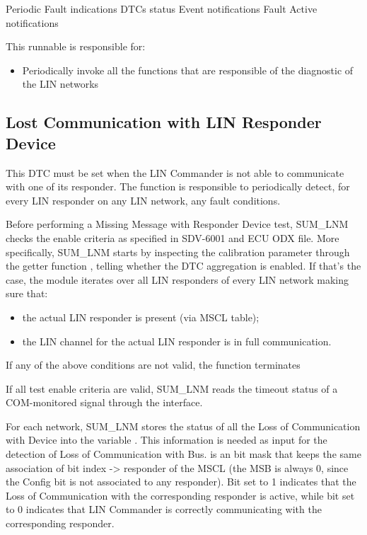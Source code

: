 {Periodic}
{}
{Fault indications \newline
DTCs status}
{Event notifications \newline
Fault Active notifications}
{}
{}
{This runnable is responsible for:
\begin{itemize}
\item Periodically invoke all the functions that are responsible of the diagnostic of the LIN networks
\end{itemize}
}

\subsection{Lost Communication with LIN Responder Device}
This DTC must be set when the LIN Commander is not able to communicate with one of its responder. The function  is responsible to periodically detect, for every LIN responder on any LIN network, any fault conditions. 
\label{subsec:lostcommwithLIN}
{
Before performing a Missing Message with Responder Device test, SUM_LNM checks the enable criteria as specified in SDV-6001 and ECU ODX file.
More specifically, SUM_LNM starts by inspecting the calibration parameter  through the getter function , telling whether the DTC aggregation is enabled. If that's the case, the module iterates over all LIN responders of every LIN network making sure that:
\begin{itemize}
\item the actual LIN responder is present (via MSCL table);
\item the LIN channel for the actual LIN responder is in full communication.
\end{itemize}
If any of the above conditions are not valid, the function  terminates
}
{}

{
If all test enable criteria are valid, SUM_LNM reads the timeout status of a COM-monitored signal through the  interface.
}
{	}


For each network, SUM_LNM stores the status of all the Loss of Communication with Device into the variable . This information is needed as input for the detection of Loss of Communication with Bus.
 is an  bit mask that keeps the same association of bit index -> responder of the MSCL (the MSB is always 0, since the Config bit is not associated to any responder). Bit set to 1 indicates 
that the Loss of Communication with the corresponding responder is active, while bit set to 0 indicates that LIN Commander is correctly communicating with the corresponding responder.

